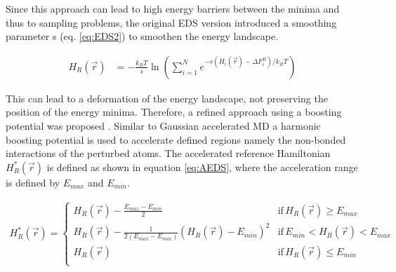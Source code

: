 Since this approach can lead to high energy barriers between the minima and thus to sampling problems, the original EDS version introduced a smoothing parameter s (eq. \ref{eq:EDS2}) to smoothen the energy landscape. 

\begin{equation}
\begin{aligned}
H_R(\vec{r}) & = -\frac{k_BT}{s} \ln  \left( \sum_{i=1}^{N} e^{ -s(H_i(\vec{r}) - \Delta F_{i}^R)/k_BT} \right) 
\end{aligned}
\label{eq:EDS2}
\end{equation}

This can lead to a deformation of the energy landscape, not preserving the position of the energy minima. Therefore, a refined approach using a boosting potential was proposed \cite{JP2018,JP2020}. Similar to Gaussian accelerated MD a harmonic boosting potential is used to accelerate defined regions namely the non-bonded interactions of the perturbed atoms. The accelerated reference Hamiltonian $H_R^{\ast}(\vec{r})$ is defined as shown in equation \ref{eq:AEDS}, where the acceleration range is defined by $E_{max}$ and $E_{min}$. 

\begin{equation}
  \begin{aligned}
H_R^{\ast}(\vec{r}) =\begin{cases}
        H_R(\vec{r}) - \frac{E_{max} - E_{min}}{2} &\text{if} \, H_R(\vec{r}) \geq E_{max} \\

        H_R(\vec{r}) - \frac{1}{2(E_{max} - E_{min})}(H_R(\vec{r}) -  E_{min})^2 &\text{if} \,  E_{min} < H_R(\vec{r}) < E_{max} \\

        H_R(\vec{r}) &\text{if} \, H_R(\vec{r}) \leq E_{min} \\
     \end{cases}
  \end{aligned}
  \label{eq:AEDS}
\end{equation}

